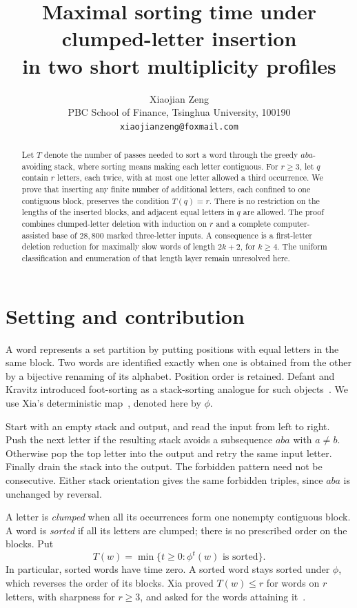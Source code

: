 \documentclass[11pt,a4paper]{article}
\title{Maximal sorting time under clumped-letter insertion\\
  in two short multiplicity profiles}
\author{Xiaojian Zeng\\
  \small PBC School of Finance, Tsinghua University, 100190\\
  \small\texttt{xiaojianzeng@foxmail.com}}
\date{}
\begin{document}
\maketitle
\begin{abstract}
Let $T$ denote the number of passes needed to sort a word through the greedy
$aba$-avoiding stack, where sorting means making each letter contiguous.
For $r\geq3$, let $q$ contain $r$ letters, each twice, with at most one letter
allowed a third occurrence. We prove that inserting any finite number of
additional letters, each confined to one contiguous block, preserves the
condition $T(q)=r$. There is no restriction on the lengths of the inserted
blocks, and adjacent equal letters in $q$ are allowed. The proof combines
clumped-letter deletion with induction on $r$ and a complete computer-assisted
base of $28{,}800$ marked three-letter inputs. A consequence is a first-letter
deletion reduction for maximally slow words of length $2k+2$, for $k\geq4$.
The uniform classification and enumeration of that length layer remain
unresolved here.
\end{abstract}

\section{Setting and contribution}

A word represents a set partition by putting positions with equal letters
in the same block. Two words are identified exactly when one is obtained
from the other by a bijective renaming of its alphabet. Position order is
retained. Defant and Kravitz introduced foot-sorting as a stack-sorting
analogue for such objects~\cite{DefantKravitz2024}. We use Xia's deterministic
map~\cite[Definition 2.5]{Xia2024}, denoted here by $\phi$.

Start with an empty stack and output, and read the input from left to right.
Push the next letter if the resulting stack avoids a subsequence $aba$ with
$a\ne b$. Otherwise pop the top letter into the output and retry the same
input letter. Finally drain the stack into the output. The forbidden pattern
need not be consecutive. Either stack orientation gives the same forbidden
triples, since $aba$ is unchanged by reversal.

A letter is \emph{clumped} when all its occurrences form one nonempty
contiguous block. A word is \emph{sorted} if all its letters are clumped;
there is no prescribed order on the blocks. Put
\[
 T(w)=\min\{t\geq0:\phi^t(w)\text{ is sorted}\}.
\]
In particular, sorted words have time zero. A sorted word stays sorted
under $\phi$, which reverses the order of its blocks. Xia proved $T(w)\leq r$
for words on $r$ letters, with sharpness for $r\geq3$, and asked for
the words attaining it~\cite[Theorem 3.1 and Question 6.1]{Xia2024}.
\end{document}
